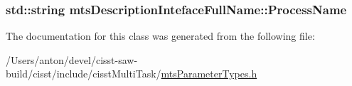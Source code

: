 \subsubsection[{Process\+Name}]{\setlength{\rightskip}{0pt plus 5cm}std\+::string mts\+Description\+Inteface\+Full\+Name\+::\+Process\+Name}\label{classmts_description_inteface_full_name_a689aee0b2ad1499297717465e612daef}


The documentation for this class was generated from the following file\+:\begin{DoxyCompactItemize}
\item 
/\+Users/anton/devel/cisst-\/saw-\/build/cisst/include/cisst\+Multi\+Task/\hyperlink{mts_parameter_types_8h}{mts\+Parameter\+Types.\+h}\end{DoxyCompactItemize}
